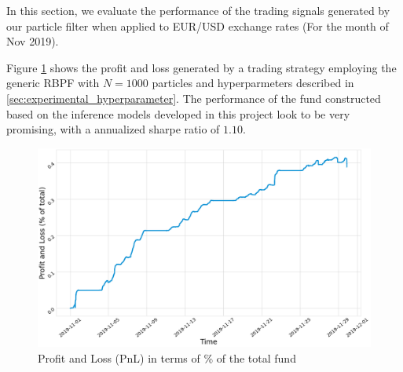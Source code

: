 \documentclass[../main.tex]{subfiles}
\begin{document}
	
	
	In this section, we evaluate the performance of the trading signals generated by our particle filter when applied to EUR/USD exchange rates (For the month of Nov 2019). 
	
	Figure \ref{fig:4__3__1__trading_performance} shows the profit and loss generated by a trading strategy employing the generic RBPF with $N=1000$ particles and hyperparmeters described in \autoref{sec:experimental_hyperparameter}. The performance of the fund constructed based on the inference models developed in this project look to be very promising, with a annualized sharpe ratio of $1.10$.
	
	\begin{figure}[h!]
		\centering
		\includegraphics[width=15.0cm]{../plots/4__3__1__trading_performance.png}
		\caption{Profit and Loss (PnL) in terms of \% of the total fund}
		\label{fig:4__3__1__trading_performance}
	\end{figure}

	
\end{document}
